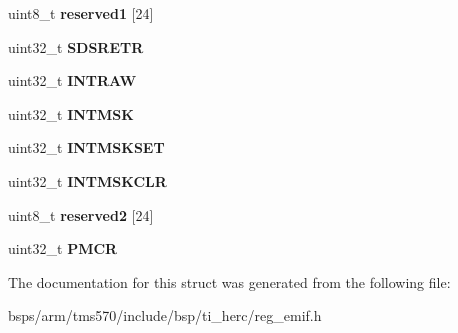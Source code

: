\begin{DoxyCompactItemize}
\item 
\mbox{\label{structtms570__emif__t_aa01a3711957d7dbc1cb1cb588511af4d}} 
uint8\+\_\+t {\bfseries reserved1} \mbox{[}24\mbox{]}
\item 
\mbox{\label{structtms570__emif__t_a83be08f49500302b2214faf4bcc1409d}} 
uint32\+\_\+t {\bfseries S\+D\+S\+R\+E\+TR}
\item 
\mbox{\label{structtms570__emif__t_a4b80a2ffbb3db4141740572ac8e3da65}} 
uint32\+\_\+t {\bfseries I\+N\+T\+R\+AW}
\item 
\mbox{\label{structtms570__emif__t_a82754b87fee05d821ab0fef5a798ea23}} 
uint32\+\_\+t {\bfseries I\+N\+T\+M\+SK}
\item 
\mbox{\label{structtms570__emif__t_a699255ebc0e11635e1fda88584101d3f}} 
uint32\+\_\+t {\bfseries I\+N\+T\+M\+S\+K\+S\+ET}
\item 
\mbox{\label{structtms570__emif__t_aac201d53a49733092709fc6ad9d7d5c6}} 
uint32\+\_\+t {\bfseries I\+N\+T\+M\+S\+K\+C\+LR}
\item 
\mbox{\label{structtms570__emif__t_a726eca04c76fea1b00aa5e3b78893d04}} 
uint8\+\_\+t {\bfseries reserved2} \mbox{[}24\mbox{]}
\item 
\mbox{\label{structtms570__emif__t_ae4095e9bf0dde23171043c1fbd9ca7dc}} 
uint32\+\_\+t {\bfseries P\+M\+CR}
\end{DoxyCompactItemize}


The documentation for this struct was generated from the following file\+:\begin{DoxyCompactItemize}
\item 
bsps/arm/tms570/include/bsp/ti\+\_\+herc/reg\+\_\+emif.\+h\end{DoxyCompactItemize}
